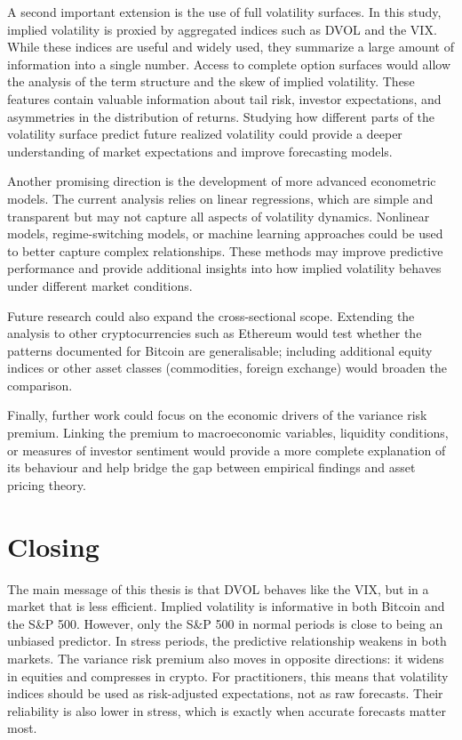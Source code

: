 \documentclass[11pt,a4paper,openany]{report}
\begin{document}
A second important extension is the use of full volatility surfaces. In
this study, implied volatility is proxied by aggregated indices such as
DVOL and the VIX. While these indices are useful and widely used, they
summarize a large amount of information into a single number. Access to
complete option surfaces would allow the analysis of the term structure
and the skew of implied volatility. These features contain valuable
information about tail risk, investor expectations, and asymmetries in
the distribution of returns. Studying how different parts of the
volatility surface predict future realized volatility could provide a
deeper understanding of market expectations and improve forecasting
models.

Another promising direction is the development of more advanced
econometric models. The current analysis relies on linear regressions,
which are simple and transparent but may not capture all aspects of
volatility dynamics. Nonlinear models, regime-switching models, or
machine learning approaches could be used to better capture complex
relationships. These methods may improve predictive performance and
provide additional insights into how implied volatility behaves under
different market conditions.

Future research could also expand the cross-sectional scope. Extending
the analysis to other cryptocurrencies such as Ethereum would test
whether the patterns documented for Bitcoin are generalisable; including
additional equity indices or other asset classes (commodities, foreign
exchange) would broaden the comparison.

Finally, further work could focus on the economic drivers of the
variance risk premium. Linking the premium to macroeconomic variables,
liquidity conditions, or measures of investor sentiment would provide a
more complete explanation of its behaviour and help bridge the gap
between empirical findings and asset pricing theory.

\section{Closing}\label{closing}

The main message of this thesis is that DVOL behaves like the VIX, but
in a market that is less efficient. Implied volatility is informative
in both Bitcoin and the S\&P 500. However, only the S\&P 500 in normal
periods is close to being an unbiased predictor. In stress periods,
the predictive relationship weakens in both markets. The variance risk
premium also moves in opposite directions: it widens in equities and
compresses in crypto. For practitioners, this means that volatility
indices should be used as risk-adjusted expectations, not as raw
forecasts. Their reliability is also lower in stress, which is exactly
when accurate forecasts matter most.
\end{document}
